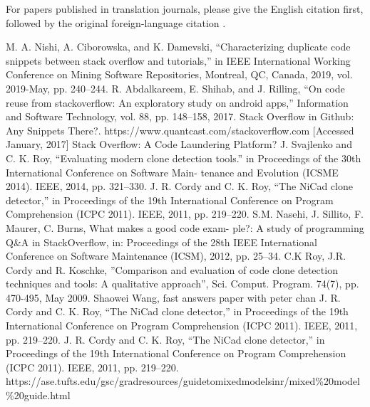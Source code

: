 \documentclass[conference]{IEEEtran}
\begin{document}
	For papers published in translation journals, please give the English 
	citation first, followed by the original foreign-language citation \cite{b6}.
	
	\begin{thebibliography}{00}
		 M. A. Nishi, A. Ciborowska, and K. Damevski, “Characterizing duplicate code snippets between stack overflow and tutorials,” in IEEE International Working Conference on Mining Software Repositories, Montreal, QC, Canada, 2019, vol. 2019-May, pp. 240–244.
		 R. Abdalkareem, E. Shihab, and J. Rilling, “On code reuse from stackoverflow: An exploratory study on android apps,” Information and Software Technology, vol. 88, pp. 148–158, 2017.
		 Stack Overflow in Github: Any Snippets There?.
		 https://www.quantcast.com/stackoverflow.com [Accessed January, 2017]
		 Stack Overflow: A Code Laundering Platform?
		 J. Svajlenko and C. K. Roy, “Evaluating modern clone detection tools.” in Proceedings of the 30th International Conference on Software Main- tenance and Evolution (ICSME 2014). IEEE, 2014, pp. 321–330.
		 J. R. Cordy and C. K. Roy, “The NiCad clone detector,” in Proceedings of the 19th International Conference on Program Comprehension (ICPC 2011). IEEE, 2011, pp. 219–220.
		 S.M. Nasehi, J. Sillito, F. Maurer, C. Burns, What makes a good code exam- ple?: A study of programming Q\&A in StackOverflow, in: Proceedings of the 28th IEEE International Conference on Software Maintenance (ICSM), 2012, pp. 25–34.
		 C.K Roy, J.R. Cordy and R. Koschke, ”Comparison and evaluation of code clone detection techniques and tools: A qualitative approach”, Sci. Comput. Program. 74(7), pp. 470-495, May 2009.
		 Shaowei Wang, fast answers paper with peter chan
		 J. R. Cordy and C. K. Roy, “The NiCad clone detector,” in Proceedings of the 19th International Conference on Program Comprehension (ICPC 2011). IEEE, 2011, pp. 219–220.
		 J. R. Cordy and C. K. Roy, “The NiCad clone detector,” in Proceedings of the 19th International Conference on Program Comprehension (ICPC 2011). IEEE, 2011, pp. 219–220.
		 https://ase.tufts.edu/gsc/gradresources/guidetomixedmodelsinr/mixed\%20model\%20guide.html
		
	\end{thebibliography}
	
	
\end{document}
